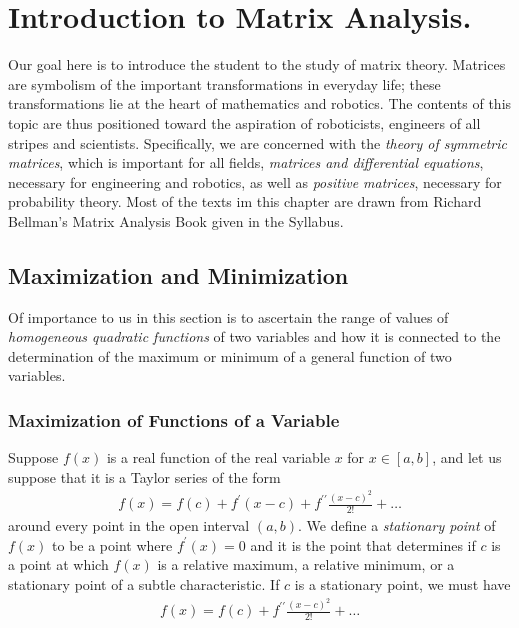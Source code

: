 \chapter{Introduction to Matrix Analysis.}  
 \label{chap:mat_anal::intro}
 
 Our goal here is to introduce the student to the study of matrix theory. Matrices are symbolism of the important transformations in everyday life; these transformations lie at the heart of mathematics and robotics. The contents of this topic are thus positioned toward the aspiration of roboticists, engineers of all stripes and scientists. Specifically, we are concerned with the \textit{theory of symmetric matrices},  which is important for all fields, \textit{matrices and differential equations}, necessary for engineering and robotics, as well as \textit{positive matrices}, necessary for probability theory. Most of the texts im this chapter are drawn from Richard Bellman's Matrix Analysis Book given in the Syllabus.
 
 \section{Maximization and Minimization}
 Of importance to us in this section is to ascertain the range of values of \textit{homogeneous quadratic functions} of two variables and how it is connected to the determination of the maximum or minimum of a general function of two variables.
 
 \subsection{Maximization of Functions of a Variable}
 Suppose $f(x)$ is a real function of the real variable $x$ for $x \in \left[a, b\right]$, and let us suppose that it is a Taylor series of the form 
 \begin{align}
 	f(x) = f(c) + f^\prime (x-c) + f^{\prime\prime}\frac{\left(x-c\right)^2}{2!} + \ldots
 \end{align}
 around every point in the open interval $\left(a, b\right)$. We define a \textit{stationary point} of $f(x)$ to be a point where $f^\prime(x) = 0$ and it is the point that determines if $c$ is a point at which $f(x)$ is a relative maximum, a relative minimum, or a stationary point of a subtle characteristic. If $c$ is a stationary point, we must have 
 \begin{align}
 	f(x) = f(c) + f^{\prime\prime}\frac{\left(x-c\right)^2}{2!} + \ldots
 \end{align}
 

